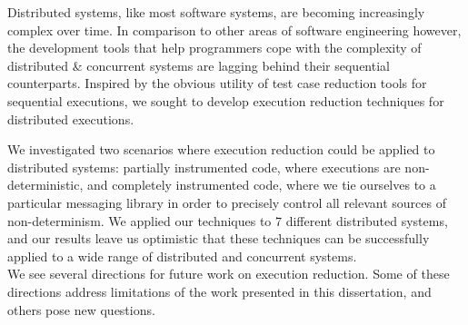 Distributed systems, like most software systems, are becoming increasingly complex over time.
In comparison to other areas of software engineering however, the development
tools that help programmers cope with the complexity of distributed \&
concurrent systems are lagging behind their sequential counterparts.
Inspired by the obvious utility of test case reduction tools for sequential
executions, we sought to develop
execution reduction techniques for distributed executions.

We investigated two scenarios where execution reduction could be applied to
distributed systems: partially instrumented code, where executions are non-deterministic, and
completely instrumented code, where we tie ourselves to a particular messaging
library in order
to precisely control all relevant sources of non-determinism. We applied our
techniques to 7 different distributed systems, and our results
leave us optimistic that these techniques can be
successfully applied to a wide range of distributed and concurrent
systems.\\[2.5ex]
%
%
 We see several directions for future work on execution reduction. Some of
these directions address limitations of the work presented in this
dissertation, and others pose new questions.

